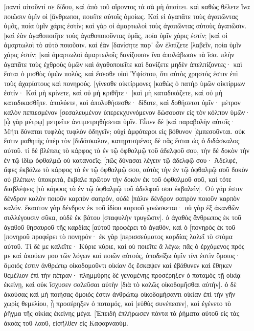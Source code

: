[παντὶ αἰτοῦντί σε δίδου, καὶ ἀπὸ τοῦ αἴροντος τὰ σὰ μὴ ἀπαίτει. 
καὶ καθὼς θέλετε ἵνα ποιῶσιν ὑμῖν οἱ [ἄνθρωποι, ποιεῖτε αὐτοῖς ὁμοίως. 
Καὶ εἰ ἀγαπᾶτε τοὺς ἀγαπῶντας ὑμᾶς, ποία ὑμῖν χάρις ἐστίν; καὶ γὰρ οἱ ἁμαρτωλοὶ τοὺς ἀγαπῶντας αὐτοὺς ἀγαπῶσιν. 
[καὶ ἐὰν ἀγαθοποιῆτε τοὺς ἀγαθοποιοῦντας ὑμᾶς, ποία ὑμῖν χάρις ἐστίν; [καὶ οἱ ἁμαρτωλοὶ τὸ αὐτὸ ποιοῦσιν. 
καὶ ἐὰν [δανίσητε παρ᾽ ὧν ἐλπίζετε [λαβεῖν, ποία ὑμῖν χάρις ἐστίν; [καὶ ἁμαρτωλοὶ ἁμαρτωλοῖς δανίζουσιν ἵνα ἀπολάβωσιν τὰ ἴσα. 
πλὴν ἀγαπᾶτε τοὺς ἐχθροὺς ὑμῶν καὶ ἀγαθοποιεῖτε καὶ δανίζετε μηδὲν ἀπελπίζοντες· καὶ ἔσται ὁ μισθὸς ὑμῶν πολύς, καὶ ἔσεσθε υἱοὶ Ὑψίστου, ὅτι αὐτὸς χρηστός ἐστιν ἐπὶ τοὺς ἀχαρίστους καὶ πονηρούς. 
[γίνεσθε οἰκτίρμονες [καθὼς ὁ πατὴρ ὑμῶν οἰκτίρμων ἐστίν· 
Καὶ μὴ κρίνετε, καὶ οὐ μὴ κριθῆτε· [καὶ μὴ καταδικάζετε, καὶ οὐ μὴ καταδικασθῆτε. ἀπολύετε, καὶ ἀπολυθήσεσθε· 
δίδοτε, καὶ δοθήσεται ὑμῖν· μέτρον καλὸν πεπιεσμένον [σεσαλευμένον ὑπερεκχυννόμενον δώσουσιν εἰς τὸν κόλπον ὑμῶν· [ᾧ γὰρ μέτρῳ] μετρεῖτε ἀντιμετρηθήσεται ὑμῖν. 
Εἶπεν δὲ [καὶ παραβολὴν αὐτοῖς· Μήτι δύναται τυφλὸς τυφλὸν ὁδηγεῖν; οὐχὶ ἀμφότεροι εἰς βόθυνον [ἐμπεσοῦνται. 
οὐκ ἔστιν μαθητὴς ὑπὲρ τὸν [διδάσκαλον, κατηρτισμένος δὲ πᾶς ἔσται ὡς ὁ διδάσκαλος αὐτοῦ. 
τί δὲ βλέπεις τὸ κάρφος τὸ ἐν τῷ ὀφθαλμῷ τοῦ ἀδελφοῦ σου, τὴν δὲ δοκὸν τὴν ἐν τῷ ἰδίῳ ὀφθαλμῷ οὐ κατανοεῖς; 
[πῶς δύνασαι λέγειν τῷ ἀδελφῷ σου· Ἀδελφέ, ἄφες ἐκβάλω τὸ κάρφος τὸ ἐν τῷ ὀφθαλμῷ σου, αὐτὸς τὴν ἐν τῷ ὀφθαλμῷ σοῦ δοκὸν οὐ βλέπων; ὑποκριτά, ἔκβαλε πρῶτον τὴν δοκὸν ἐκ τοῦ ὀφθαλμοῦ σοῦ, καὶ τότε διαβλέψεις [τὸ κάρφος τὸ ἐν τῷ ὀφθαλμῷ τοῦ ἀδελφοῦ σου ἐκβαλεῖν]. 
Οὐ γάρ ἐστιν δένδρον καλὸν ποιοῦν καρπὸν σαπρόν, οὐδὲ [πάλιν δένδρον σαπρὸν ποιοῦν καρπὸν καλόν. 
ἕκαστον γὰρ δένδρον ἐκ τοῦ ἰδίου καρποῦ γινώσκεται· οὐ γὰρ ἐξ ἀκανθῶν συλλέγουσιν σῦκα, οὐδὲ ἐκ βάτου [σταφυλὴν τρυγῶσιν]. 
ὁ ἀγαθὸς ἄνθρωπος ἐκ τοῦ ἀγαθοῦ θησαυροῦ τῆς καρδίας [αὐτοῦ προφέρει τὸ ἀγαθόν, καὶ ὁ [πονηρὸς ἐκ τοῦ [πονηροῦ προφέρει τὸ πονηρόν· ἐκ γὰρ [περισσεύματος καρδίας λαλεῖ τὸ στόμα αὐτοῦ. 
Τί δέ με καλεῖτε· Κύριε κύριε, καὶ οὐ ποιεῖτε ἃ λέγω; 
πᾶς ὁ ἐρχόμενος πρός με καὶ ἀκούων μου τῶν λόγων καὶ ποιῶν αὐτούς, ὑποδείξω ὑμῖν τίνι ἐστὶν ὅμοιος· 
ὅμοιός ἐστιν ἀνθρώπῳ οἰκοδομοῦντι οἰκίαν ὃς ἔσκαψεν καὶ ἐβάθυνεν καὶ ἔθηκεν θεμέλιον ἐπὶ τὴν πέτραν· πλημμύρης δὲ γενομένης προσέρηξεν ὁ ποταμὸς τῇ οἰκίᾳ ἐκείνῃ, καὶ οὐκ ἴσχυσεν σαλεῦσαι αὐτὴν [διὰ τὸ καλῶς οἰκοδομῆσθαι αὐτήν]. 
ὁ δὲ ἀκούσας καὶ μὴ ποιήσας ὅμοιός ἐστιν ἀνθρώπῳ οἰκοδομήσαντι οἰκίαν ἐπὶ τὴν γῆν χωρὶς θεμελίου, ᾗ προσέρηξεν ὁ ποταμός, καὶ [εὐθὺς συνέπεσεν], καὶ ἐγένετο τὸ ῥῆγμα τῆς οἰκίας ἐκείνης μέγα. 
[Ἐπειδὴ ἐπλήρωσεν πάντα τὰ ῥήματα αὐτοῦ εἰς τὰς ἀκοὰς τοῦ λαοῦ, εἰσῆλθεν εἰς Καφαρναούμ. 
